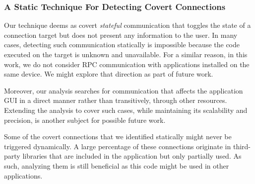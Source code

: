 \subsubsection{A Static Technique For Detecting Covert Connections}
Our technique deems 
%
as covert \emph{stateful} communication that toggles
the state of a connection target but does not present any information to the user. 
In many cases, detecting such
communication statically is impossible because the code executed on
the target is unknown and unavailable. 
For a similar reason, in this work, we do not consider RPC communication with applications
installed on the same device. We might explore that direction as part of future work. 

Moreover, our analysis searches for communication that affects the
application GUI in a direct manner rather than transitively, through other resources. 
Extending the analysis to cover such cases, while maintaining its scalability and precision, 
is another subject for possible future work.
 
Some of the covert connections that we identified statically might never be triggered dynamically. 
A large percentage of these connections originate in  
third-party libraries that are included in the application but only partially used. 
As such, analyzing them is still beneficial as this code might be used in other applications.


